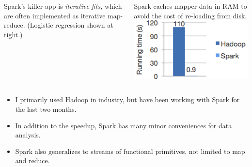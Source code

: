 \documentclass{beamer}
\begin{document}
\begin{frame}{}
\begin{columns}
Spark's killer app is {\it iterative fits,} which are often implemented as iterative map-reduce. (Logistic regression shown at right.)

\vspace{0.2 cm}
Spark caches mapper data in RAM to avoid the cost of re-loading from disk.
\includegraphics[width=\linewidth]{spark_time.png}
\end{columns}

\vfill
\begin{itemize}
\item I primarily used Hadoop in industry, but have been working with Spark for the last two months.
\item In addition to the speedup, Spark has many minor conveniences for data analysis.
\item Spark also generalizes to streams of functional primitives, not limited to map and reduce.
\end{itemize}
\end{frame}
\end{document}
